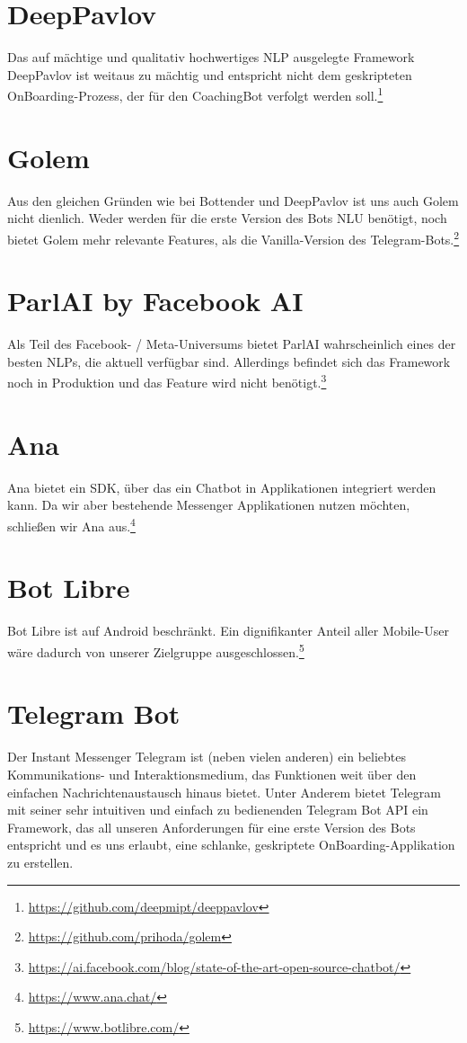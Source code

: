     \section{DeepPavlov} 
        Das auf mächtige und qualitativ hochwertiges NLP ausgelegte Framework DeepPavlov ist weitaus zu mächtig und entspricht nicht dem geskripteten OnBoarding-Prozess, der für den CoachingBot verfolgt werden soll.\footnote{\url{https://github.com/deepmipt/deeppavlov}}
        

    \section{Golem} 
        Aus den gleichen Gründen wie bei Bottender und DeepPavlov ist uns auch Golem nicht dienlich. Weder werden für die erste Version des Bots NLU benötigt, noch bietet Golem mehr relevante Features, als die Vanilla-Version des Telegram-Bots.\footnote{\url{https://github.com/prihoda/golem}}
        

    \section{ParlAI by Facebook AI} 
        Als Teil des Facebook- / Meta-Universums bietet ParlAI wahrscheinlich eines der besten NLPs, die aktuell verfügbar sind. Allerdings befindet sich das Framework noch in Produktion und das Feature wird nicht benötigt.\footnote{\url{https://ai.facebook.com/blog/state-of-the-art-open-source-chatbot/}}
        

    \section{Ana} 
        Ana bietet ein SDK, über das ein Chatbot in Applikationen integriert werden kann. Da wir aber bestehende Messenger Applikationen nutzen möchten, schließen wir Ana aus.\footnote{\url{https://www.ana.chat/}}
        

    \section{Bot Libre} 
        Bot Libre ist auf Android beschränkt. Ein dignifikanter Anteil aller Mobile-User wäre dadurch von unserer Zielgruppe ausgeschlossen.\footnote{\url{https://www.botlibre.com/}} 
        
        
    \section{Telegram Bot}
        Der Instant Messenger Telegram ist (neben vielen anderen) ein beliebtes Kommunikations- und Interaktionsmedium, das Funktionen weit über den einfachen Nachrichtenaustausch hinaus bietet. Unter Anderem bietet Telegram mit seiner sehr intuitiven und einfach zu bedienenden Telegram Bot API ein Framework, das all unseren Anforderungen für eine erste Version des Bots entspricht und es uns erlaubt, eine schlanke, geskriptete OnBoarding-Applikation zu erstellen.
        

